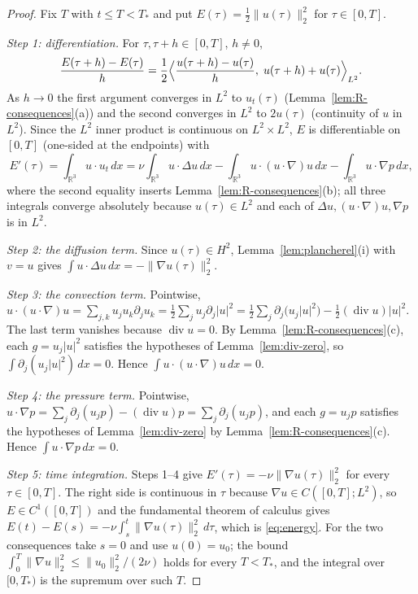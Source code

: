 \documentclass[11pt]{article}
\theoremstyle{definition}
\theoremstyle{plain}
\newcommand{\R}{\mathbb R}
\begin{document}
\begin{proof}
Fix $T$ with $t\le T<T_*$ and put $E(\tau)=\frac12\|u(\tau)\|_2^2$ for
$\tau\in[0,T]$.

\emph{Step 1: differentiation.}  For $\tau,\tau+h\in[0,T]$, $h\ne0$,
\[
 \frac{E(\tau+h)-E(\tau)}h
 =\frac12\Bigl\langle\frac{u(\tau+h)-u(\tau)}h,\;u(\tau+h)+u(\tau)\Bigr\rangle_{L^2}.
\]
As $h\to0$ the first argument converges in $L^2$ to $u_t(\tau)$
(Lemma~\ref{lem:R-consequences}(a)) and the second converges in $L^2$ to
$2u(\tau)$ (continuity of $u$ in $L^2$).  Since the $L^2$ inner product is
continuous on $L^2\times L^2$, $E$ is differentiable on $[0,T]$ (one-sided
at the endpoints) with
\begin{equation}\label{eq:energy-derivative}
 E'(\tau)=\int_{\R^3}u\cdot u_t\,dx
 =\nu\int_{\R^3}u\cdot\Delta u\,dx-\int_{\R^3}u\cdot(u\cdot\nabla)u\,dx
  -\int_{\R^3}u\cdot\nabla p\,dx,
\end{equation}
where the second equality inserts Lemma~\ref{lem:R-consequences}(b); all
three integrals converge absolutely because $u(\tau)\in L^2$ and each of
$\Delta u,(u\cdot\nabla)u,\nabla p$ is in $L^2$.

\emph{Step 2: the diffusion term.}  Since $u(\tau)\in H^2$,
Lemma~\ref{lem:plancherel}(i) with $v=u$ gives
$\int u\cdot\Delta u\,dx=-\|\nabla u(\tau)\|_2^2$.

\emph{Step 3: the convection term.}  Pointwise,
$u\cdot(u\cdot\nabla)u=\sum_{j,k}u_ju_k\partial_ju_k
=\frac12\sum_ju_j\partial_j|u|^2
=\frac12\sum_j\partial_j\bigl(u_j|u|^2\bigr)-\frac12(\operatorname{div}u)|u|^2$.
The last term vanishes because $\operatorname{div}u=0$.  By
Lemma~\ref{lem:R-consequences}(c), each $g=u_j|u|^2$ satisfies the
hypotheses of Lemma~\ref{lem:div-zero}, so $\int\partial_j(u_j|u|^2)\,dx=0$.
Hence $\int u\cdot(u\cdot\nabla)u\,dx=0$.

\emph{Step 4: the pressure term.}  Pointwise,
$u\cdot\nabla p=\sum_j\partial_j(u_jp)-(\operatorname{div}u)p
=\sum_j\partial_j(u_jp)$, and each $g=u_jp$ satisfies the hypotheses of
Lemma~\ref{lem:div-zero} by Lemma~\ref{lem:R-consequences}(c).  Hence
$\int u\cdot\nabla p\,dx=0$.

\emph{Step 5: time integration.}  Steps 1--4 give
$E'(\tau)=-\nu\|\nabla u(\tau)\|_2^2$ for every $\tau\in[0,T]$.  The right
side is continuous in $\tau$ because $\nabla u\in C([0,T];L^2)$, so
$E\in C^1([0,T])$ and the fundamental theorem of calculus gives
$E(t)-E(s)=-\nu\int_s^t\|\nabla u(\tau)\|_2^2\,d\tau$, which is
\eqref{eq:energy}.  For the two consequences take $s=0$ and use $u(0)=u_0$;
the bound $\int_0^T\|\nabla u\|_2^2\le\|u_0\|_2^2/(2\nu)$ holds for every
$T<T_*$, and the integral over $[0,T_*)$ is the supremum over such $T$.
\end{proof}
\end{document}
